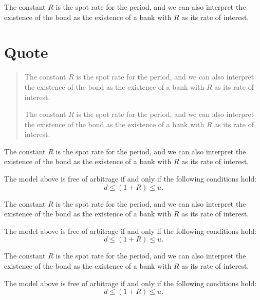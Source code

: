 \documentclass{Base}
\begin{document}
The constant $R$ is the spot rate for the period, and we can also
interpret the existence of the bond as the existence of a bank
with $R$ as its rate of interest.

\section*{Quote}

\begin{quote}
\item The constant $R$ is the spot rate for the period, and we can also
interpret the existence of the bond as the existence of a bank
with $R$ as its rate of interest.


\item
The constant $R$ is the spot rate for the period, and we can also
interpret the existence of the bond as the existence of a bank
with $R$ as its rate of interest.
\end{quote}
The constant $R$ is the spot rate for the period, and we can also
interpret the existence of the bond as the existence of a bank
with $R$ as its rate of interest.

\begin{theorem}
The model above is free of arbitrage if and only if the following
conditions hold:
\begin{equation}\label{noarb}
d \leq (1+R) \leq u.
\end{equation}
\end{theorem}

The constant $R$ is the spot rate for the period, and we can also
interpret the existence of the bond as the existence of a bank
with $R$ as its rate of interest.

\begin{fp}
The model above is free of arbitrage if and only if the following
conditions hold:
\begin{equation}\label{noarb}
d \leq (1+R) \leq u.
\end{equation}
\end{fp}

The constant $R$ is the spot rate for the period, and we can also
interpret the existence of the bond as the existence of a bank
with $R$ as its rate of interest.

\begin{corollary}
The model above is free of arbitrage if and only if the following
conditions hold:
\begin{equation}\label{noarb}
d \leq (1+R) \leq u.
\end{equation}
\end{corollary}
\end{document}

